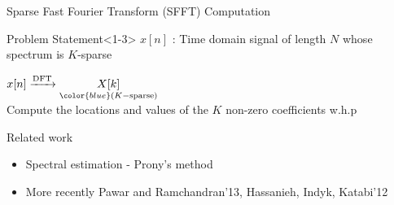 	\begin{frame}{Sparse Fast Fourier Transform (SFFT) Computation}
	
	 \begin{block}{Problem Statement}<1-3>
	 	\vspace{4pt}
	 	{\centering \alert{$x[n]$} : Time domain signal of length $N$ whose spectrum is $K$-sparse \\}
	\vspace{10pt} 	
	 	\centering	
	 	
	 {\large	$x[n]  \xrightarrow{\text{DFT}}  \underset{\color{blue}(K-\text{sparse})}{X[k]}$ \\}
	 	\vspace{10pt}
	 	Compute the {\alert{locations}} and \alert{values} of the $K$ non-zero coefficients w.h.p
	 \end{block}
	
	
	
	 {\begin{block}{Related work}
		\begin{itemize}
			\item Spectral estimation - Prony's method
			\item More recently Pawar and Ramchandran'13, Hassanieh, Indyk, Katabi'12
		\end{itemize}
	\end{block}}
	
	
	\end{frame}
